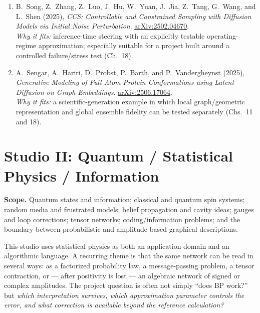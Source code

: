 \documentclass[11pt]{article}
\newcommand{\studio}[1]{\section{#1}}
\begin{document}
\begin{enumerate}[leftmargin=1.7em,itemsep=5pt]
    \item B.~Song, Z.~Zhang, Z.~Luo, J.~Hu, W.~Yuan, J.~Jia, Z.~Tang, G.~Wang, and L.~Shen (2025), \emph{CCS: Controllable and Constrained Sampling with Diffusion Models via Initial Noise Perturbation}. \href{https://arxiv.org/abs/2502.04670}{arXiv:2502.04670}.\\
    \textcolor{UAgray}{\emph{Why it fits:} inference-time steering with an explicitly testable operating-regime approximation; especially suitable for a project built around a controlled failure/stress test (Ch.~18).}

    \item A.~Sengar, A.~Hariri, D.~Probst, P.~Barth, and P.~Vandergheynst (2025), \emph{Generative Modeling of Full-Atom Protein Conformations using Latent Diffusion on Graph Embeddings}. \href{https://arxiv.org/abs/2506.17064}{arXiv:2506.17064}.\\
    \textcolor{UAgray}{\emph{Why it fits:} a scientific-generation example in which local graph/geometric representation and global ensemble fidelity can be tested separately (Chs.~11 and 18).}
\end{enumerate}


\studio{Studio II: Quantum / Statistical Physics / Information}

\textbf{Scope.} Quantum states and information; classical and quantum spin systems; random media and frustrated models; belief propagation and cavity ideas; gauges and loop corrections; tensor networks; coding/information problems; and the boundary between probabilistic and amplitude-based graphical descriptions.

This studio uses statistical physics as both an application domain and an algorithmic language. A recurring theme is that the same network can be read in several ways: as a factorized probability law, a message-passing problem, a tensor contraction, or --- after positivity is lost --- an algebraic network of signed or complex amplitudes. The project question is often not simply ``does BP work?'' but \emph{which interpretation survives, which approximation parameter controls the error, and what correction is available beyond the reference calculation?}
\end{document}
